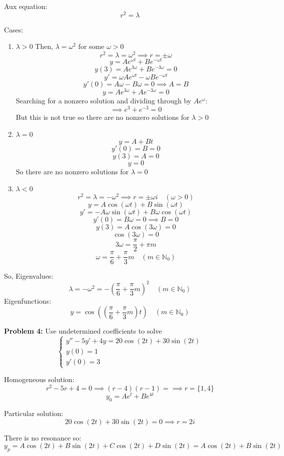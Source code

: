 \documentclass[12pt]{article}
\begin{document}
Aux equation: 
\[r^2 = \lambda\]

Cases:
\begin{enumerate}
    \item $\lambda > 0$
    Then, $\lambda = \omega^2$ for some $\omega > 0$
    \[r^2 = \lambda = \omega^2 \implies r = \pm \omega\]
    \[y = Ae^{\omega t} + Be^{-\omega t}\]
    \[y(3) = Ae^{3\omega} + Be^{-3\omega} = 0\]
    \[y' = \omega Ae^{\omega t} - \omega Be^{- \omega t}\]
    \[y'(0) = A\omega - B\omega = 0 \implies A = B\]
    \[y = Ae^{3\omega} + Ae^{-3\omega} = 0 \]
    Searching for a nonzero solution and dividing through by $Ae^\omega$:
    \[\implies e^3 + e^{-3} = 0\]
    But this is not true so there are no nonzero solutions for $\lambda > 0$
    
    \item $\lambda = 0$
    \[y = A + Bt\]
    \[y'(0) = B = 0\]
    \[y(3) = A = 0\]
    \[y = 0\]
    So there are no nonzero solutions for $\lambda = 0$

    \item $\lambda < 0$
    \[r^2 = \lambda = -\omega^2 \implies r = \pm \omega i \quad (\omega > 0)\]
    \[y = A\cos(\omega t) + B \sin(\omega t)\]
    \[y' = -A\omega \sin(\omega t) + B\omega \cos( \omega t)\]
    \[y' (0) = B\omega = 0 \implies B = 0 \]
    \[y(3) = A\cos(3\omega) = 0\]
    \[\cos(3\omega) = 0\]
    \[3\omega = \frac{\pi}{2} + \pi m\]
    \[\omega = \frac{\pi}{6} + \frac{\pi}{3} m \quad (m \in \mathbb{N}_0)\]
\end{enumerate}

So, 
Eigenvalues: 
\[\lambda = -\omega^2 = \boxed{-\left(\frac{\pi}{6} + \frac{\pi}{3}m\right)^2 \quad (m \in \mathbb{N}_0)}\]
Eigenfunctions:
\[\boxed{y = \cos(\left(\frac{\pi}{6} + \frac{\pi}{3} m\right)t) \quad (m \in \mathbb{N}_0)}\]

\pagebreak

\textbf{Problem 4:} Use undetermined coefficients to solve
\[\begin{cases}
    y'' - 5y' + 4y = 20\cos (2t) + 30\sin (2t)\\
    y(0) = 1\\
    y'(0) = 3
\end{cases}\]

Homogeneous solution:
\[r^2 - 5r + 4 = 0 \implies (r - 4)(r- 1) = \implies r = \{1, 4\}\]
\[y_0 = Ae^t + Be^{4t}\]

Particular solution:
\[20 \cos(2t) + 30\sin(2t) = 0 \implies r = 2i\]

There is no resonance so:
\[y_p = A\cos(2t) + B\sin(2t) + C\cos(2t) + D\sin(2t) = A\cos(2t) + B\sin(2t)\]
\end{document}
